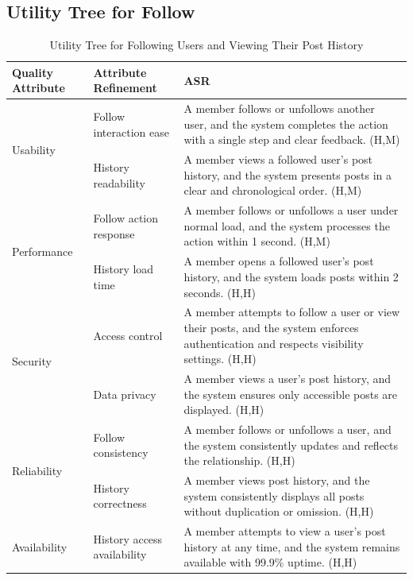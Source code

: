 \documentclass{article}
\begin{document}
\subsection{Utility Tree for Follow}

\begin{table}[H]
\centering
\caption{Utility Tree for Following Users and Viewing Their Post History}
\begin{tabular}{|p{3cm}|p{4cm}|p{7cm}|}
\hline
\textbf{Quality Attribute} & \textbf{Attribute Refinement} & \textbf{ASR} \\
\hline

\multirow{2}{*}{Usability}
& Follow interaction ease
& A member follows or unfollows another user, and the system completes the action with a single step and clear feedback. (H,M) \\
\cline{2-3}
& History readability
& A member views a followed user's post history, and the system presents posts in a clear and chronological order. (H,M) \\
\hline

\multirow{2}{*}{Performance}
& Follow action response
& A member follows or unfollows a user under normal load, and the system processes the action within 1 second. (H,M) \\
\cline{2-3}
& History load time
& A member opens a followed user's post history, and the system loads posts within 2 seconds. (H,H) \\
\hline

\multirow{2}{*}{Security}
& Access control
& A member attempts to follow a user or view their posts, and the system enforces authentication and respects visibility settings. (H,H) \\
\cline{2-3}
& Data privacy
& A member views a user's post history, and the system ensures only accessible posts are displayed. (H,H) \\
\hline

\multirow{2}{*}{Reliability}
& Follow consistency
& A member follows or unfollows a user, and the system consistently updates and reflects the relationship. (H,H) \\
\cline{2-3}
& History correctness
& A member views post history, and the system consistently displays all posts without duplication or omission. (H,H) \\
\hline

Availability
& History access availability
& A member attempts to view a user's post history at any time, and the system remains available with 99.9\% uptime. (H,H) \\
\hline


\end{tabular}
\end{table}
\end{document}

